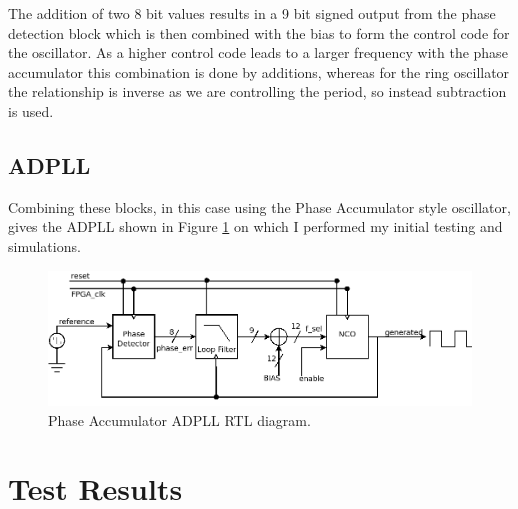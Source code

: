 \documentclass[11pt,english,british]{report}
\begin{document}
The addition of two 8 bit values results in a 9 bit signed output from the phase detection block which is then combined with the bias to form the control code for the oscillator. As a higher control code leads to a larger frequency with the phase accumulator this combination is done by additions, whereas for the ring oscillator the relationship is inverse as we are controlling the period, so instead subtraction is used.

\section{ADPLL}
Combining these blocks, in this case using the Phase Accumulator style oscillator, gives the ADPLL shown in Figure \ref{fig:my_adpll} on which I performed my initial testing and simulations.
\begin{figure}[h]
	\centering
	\includegraphics[scale=0.35]{../rtl}
	\caption{Phase Accumulator ADPLL RTL diagram.}
	\label{fig:my_adpll}
\end{figure}

\chapter{Test Results}
\end{document}
